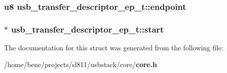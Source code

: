\subsubsection{\setlength{\rightskip}{0pt plus 5cm}u8 {\bf usb\_\-transfer\_\-descriptor\_\-ep\_\-t::endpoint}}\label{structusb__transfer__descriptor__ep__t_c246454943d6067d489fe6b8619cd9f8}


\subsubsection{$\ast$ {\bf usb\_\-transfer\_\-descriptor\_\-ep\_\-t::start}}\label{structusb__transfer__descriptor__ep__t_a2a19c8fe80a80a0a39f34116de6cb4a}




The documentation for this struct was generated from the following file:\begin{CompactItemize}
\item 
/home/bene/projects/sl811/usbstack/core/{\bf core.h}\end{CompactItemize}
